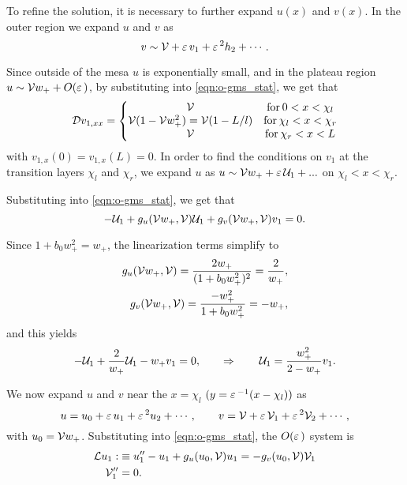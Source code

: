 To refine the solution, it is necessary to further expand $u(x)$ and $v(x)$. In the outer region we expand $u$ and $v$ as
$$
v\sim \mathcal{V} + \varepsilon\, v_1 + \varepsilon\,^2 h_2 + \cdots.
$$

Since outside of the mesa $u$ is exponentially small, and in the plateau region $u\sim\mathcal{V} w_+ + O(\varepsilon\,)$, by substituting into \eqref{eqn:o-gms_stat}, we get that
% 
\begin{equation}
\label{eqn:o-v1}
	\begin{split}
	\mathcal{D} v_{1,xx}
   = \left\{
	\begin{matrix}
		\mathcal{V}& \mathrm{for}\hspace{2pt}0< x<\chi_l \\
		\mathcal{V}(1-\mathcal{V} w_+^2) = \mathcal{V}(1-L/l)& \mathrm{for}\hspace{2pt}\chi_l< x<\chi_r\\
		\mathcal{V}& \mathrm{for}\hspace{2pt}\chi_r<x<L
	\end{matrix}\right.
	\end{split}
\end{equation}
% 
with $v_{1,x}(0) = v_{1,x}(L) = 0$. In order to find the conditions on $v_1$ at the transition layers $\chi_l$ and $\chi_r$, we expand $u$ as $u\sim\mathcal{V} w_+ + \varepsilon\,\mathcal{U}_1 + ...$ on $\chi_l<x<\chi_r$.

Substituting into \eqref{eqn:o-gms_stat}, we get that 
\[
-\mathcal{U}_1 + g_u(\mathcal{V} w_+,\mathcal{V})\mathcal{U}_1 + g_v(\mathcal{V} w_+,\mathcal{V})v_1 = 0.
\]

Since $1+b_0w_+^2 = w_+$, the linearization terms simplify to
% 
\begin{equation}
\label{eqn:derivs}
\begin{split}
\begin{aligned}
  g_u(\mathcal{V} w_+,\mathcal{V}) = \frac{2w_+}{(1+b_0w_+^2)^2} = \frac{2}{w_+},\\
  g_v(\mathcal{V} w_+,\mathcal{V}) = \frac{-w_+^2}{1+b_0w_+^2} = -w_+,
\end{aligned}
\end{split}
\end{equation}
% 
and this yields
$$
-\mathcal{U}_1 + \frac{2}{w_+}\mathcal{U}_1 - w_+v_1 = 0,\qquad \Rightarrow \qquad \mathcal{U}_1 = \frac{w_+^2}{2-w_+}v_1.
$$

We now expand $u$ and $v$ near the $x=\chi_l$ $(y=\varepsilon\,^{-1}(x-\chi_l))$ as
% 
\begin{equation*}
  u = u_0 + \varepsilon\, u_1 + \varepsilon\,^2 u_2+ \cdots,\qquad v = \mathcal{V} + \varepsilon\,\mathcal{V}_1 + \varepsilon\,^2\mathcal{V}_2+\cdots,
\end{equation*}
% 
with $u_0 = \mathcal{V} w_+$. Substituting into \eqref{eqn:o-gms_stat}, the $O(\varepsilon\,)$ system is
% 
\begin{equation}
\label{eqn:ord_epsilon}
\begin{split}
\begin{aligned}
  \mathcal{L} u_1:&\equiv u_1''-u_1 + g_u(u_0,\mathcal{V})u_1 = -g_v(u_0,\mathcal{V})\mathcal{V}_1 \\
  \mathcal{V}_1'' &= 0.
\end{aligned}
\end{split}
\end{equation}
% 

